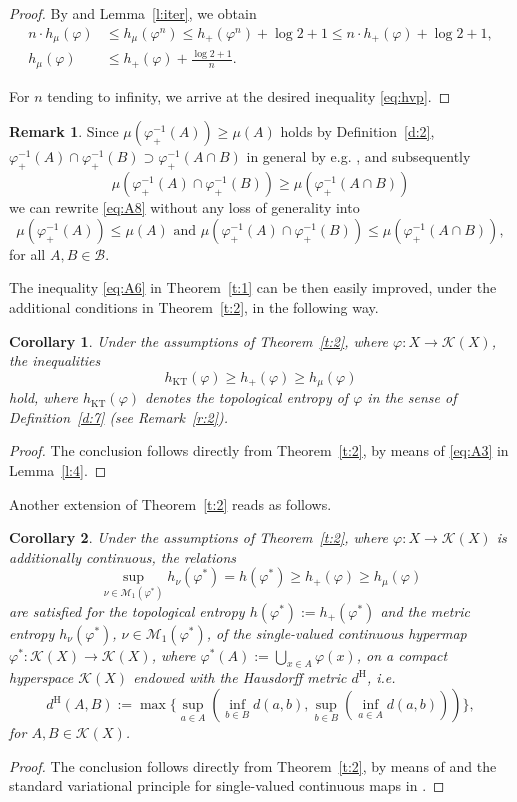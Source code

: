 \documentclass[12pt]{amsart}
\newtheorem{corollary}{Corollary}
\theoremstyle{definition}
\newtheorem{remark}{Remark}
\newcommand{\dH}{d^{\mathrm{H}}}
\newcommand{\M}{{\mathcal{M}}}
\newcommand{\KK}{\mathcal K}
\newcommand{\vp}{\varphi}
\newcommand{\B}{{\mathcal{B}}}
\newcommand{\KT}{\operatorname{KT}}
\newcommand{\hKT}{h_{\KT}}
\begin{document}
\begin{proof}
By \cite[Theorem 3.1]{VS} and Lemma~\ref{l:iter}, we obtain
\begin{align*}
n \cdot h_{\mu}(\vp) &\leq h_{\mu}(\vp^n) \leq h_{+}(\vp^n) + \log 2 + 1 \leq n \cdot h_{+}(\vp) + \log 2 + 1,\\
h_{\mu}(\vp) &\leq h_{+}(\vp) + \frac{\log 2 + 1}{n}.
\end{align*}

For $n$ tending to infinity, we arrive at the desired inequality \eqref{eq:hvp}.
\end{proof}

\begin{remark}
Since $\mu(\vp^{-1}_+(A))\geq\mu(A)$ holds by Definition~\ref{d:2}, $\vp^{-1}_+(A)\cap\vp^{-1}_+(B)\supset\vp^{-1}_+(A\cap B)$ in general by e.g. \cite[Proposition 1.2.2]{HP}, and subsequently
\[
\mu(\vp^{-1}_+(A)\cap\vp^{-1}_+(B))\geq \mu(\vp^{-1}_+(A\cap B))
\]
we can rewrite \eqref{eq:A8} without any loss of generality into
\[
\mu(\vp_{+}^{-1}(A))\leq\mu(A) \mbox{ and } \mu(\vp_{+}^{-1}(A)\cap\vp_{+}^{-1}(B)) \leq \mu(\vp_{+}^{-1}(A\cap B)),
\]
for all $A,B\in\B$.
\end{remark}

The inequality \eqref{eq:A6} in Theorem~\ref{t:1} can be then easily improved, under the additional conditions in Theorem~\ref{t:2}, in the following way.

\begin{corollary}\label{c:1}
Under the assumptions of Theorem~\ref{t:2}, where $\vp: X\to\KK(X)$, the inequalities
\[
\hKT(\vp) \geq h_+(\vp) \geq h_{\mu}(\vp)
\]
hold, where $\hKT(\vp)$ denotes the topological entropy of $\vp$ in the sense of Definition~\ref{d:7} (see Remark~\ref{r:2}).
\end{corollary}
\begin{proof}
The conclusion follows directly from Theorem~\ref{t:2}, by means of \eqref{eq:A3} in Lemma~\ref{l:4}.
\end{proof}

Another extension of Theorem~\ref{t:2} reads as follows.
\begin{corollary}\label{c:2}
Under the assumptions of Theorem~\ref{t:2}, where $\vp:X\to\KK(X)$ is additionally continuous, the relations
\[
\sup_{\nu\in\M_1(\vp^*)}h_\nu(\vp^*) = h(\vp^*) \geq h_+(\vp) \geq h_\mu(\vp)
\]
are satisfied for the topological entropy $h(\vp^*):=h_+(\vp^*)$ and the metric entropy $h_\nu(\vp^*)$, $\nu\in\M_1(\vp^*)$, of the single-valued continuous hypermap $\vp^*:\KK(X)\to\KK(X)$, where $\vp^*(A):=\bigcup_{x\in A} \vp(x)$, on a compact hyperspace $\KK(X)$ endowed with the Hausdorff metric $\dH$, i.e.
\[
\dH(A,B) := \max \{\sup_{a\in A}(\inf_{b\in B} d(a,b), \sup_{b\in B}(\inf_{a\in A} d(a,b)))\},
\]
for $A,B\in\KK(X)$.
\end{corollary}
\begin{proof}
The conclusion follows directly from Theorem~\ref{t:2}, by means of \cite[Theorem 7]{AL1} and the standard variational principle for single-valued continuous maps in \cite{Go3,Mi,Wa}.
\end{proof}
\end{document}
